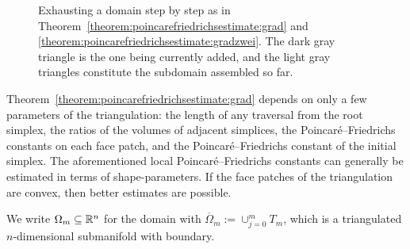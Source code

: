 \documentclass[a4paper]{article}
\begin{document}
\begin{figure}[t]
\begin{center}
\end{center}
\caption{Exhausting a domain step by step as in Theorem~\ref{theorem:poincarefriedrichsestimate:grad} and \ref{theorem:poincarefriedrichsestimate:gradzwei}.
The dark gray triangle is the one being currently added, and the light gray triangles constitute the subdomain assembled so far.}
\label{figure:exhausting}
\end{figure}

\begin{remark}
    Theorem~\ref{theorem:poincarefriedrichsestimate:grad} depends on only a few parameters of the triangulation:
    the length of any traversal from the root simplex, the ratios of the volumes of adjacent simplices,
    the Poincar\'e--Friedrichs constants on each face patch, and the Poincar\'e--Friedrichs constant of the initial simplex. 
    The aforementioned local Poincar\'e--Friedrichs constants can generally be estimated in terms of shape-parameters. 
    If the face patches of the triangulation are convex, then better estimates are possible. 
\end{remark}

We write $\Omega_{m} \subseteq {\mathbb R}^{n}$ for the domain with $\overline\Omega_m := \cup_{j=0}^{m} T_m$, 
    which is a triangulated $n$-dimensional submanifold with boundary.
\end{document}
